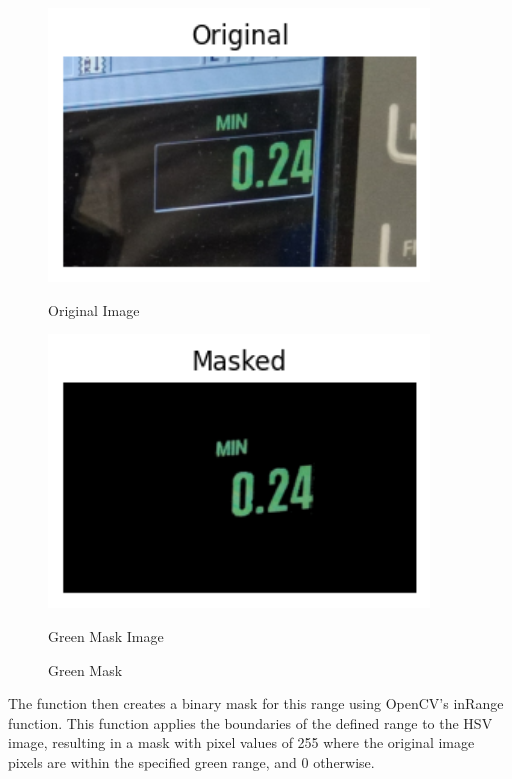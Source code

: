 \begin{figure}[h]
    \centering
    \begin{minipage}{0.45\textwidth}
        \centering
        \includegraphics[width=0.9\textwidth]{Figures/green_mask/original.png}
        \caption*{Original Image}
    \end{minipage}\hfill
    \begin{minipage}{0.45\textwidth}
        \centering
        \includegraphics[width=0.9\textwidth]{Figures/green_mask/green_mask.png}
        \caption*{Green Mask Image}
    \end{minipage}
    \caption{Green Mask}
\end{figure}


The function then creates a binary mask for this range using OpenCV's inRange function. This function applies the boundaries of the defined range to the HSV image, resulting in a mask with pixel values of 255 where the original image pixels are within the specified green range, and 0 otherwise.

